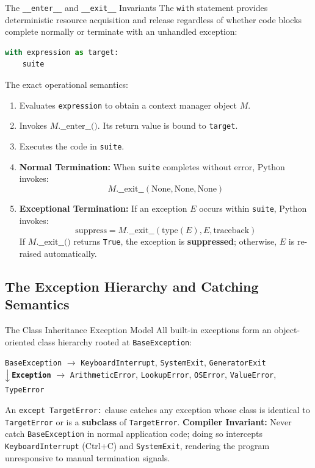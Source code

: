 \begin{theorembox}{The \texttt{\_\_enter\_\_} and \texttt{\_\_exit\_\_} Invariants}
 
The \texttt{with} statement provides deterministic resource acquisition and release regardless of whether code blocks complete normally or terminate with an unhandled exception:
\begin{lstlisting}[language=Python]
with expression as target:
    suite
\end{lstlisting}
The exact operational semantics:
\begin{enumerate}
    \item Evaluates \texttt{expression} to obtain a context manager object $M$.
    \item Invokes $M\text{.\_\_enter\_\_()}$. Its return value is bound to \texttt{target}.
    \item Executes the code in \texttt{suite}.
    \item \textbf{Normal Termination:} When \texttt{suite} completes without error, Python invokes:
    \begin{equation}
    M.\_\_\text{exit}\_\_(\text{None}, \text{None}, \text{None})
    \end{equation}
    \item \textbf{Exceptional Termination:} If an exception $E$ occurs within \texttt{suite}, Python invokes:
    \begin{equation}
    \text{suppress} = M.\_\_\text{exit}\_\_(\text{type}(E), E, \text{traceback})
    \end{equation}
    If $M\text{.\_\_exit\_\_()}$ returns \texttt{True}, the exception is \textbf{suppressed}; otherwise, $E$ is re-raised automatically.
\end{enumerate}
\end{theorembox}

\subsection{The Exception Hierarchy and Catching Semantics}

\begin{theorembox}{The Class Inheritance Exception Model}
All built-in exceptions form an object-oriented class hierarchy rooted at \texttt{BaseException}:
\begin{center}
\small
\texttt{BaseException} $\longrightarrow$ \texttt{KeyboardInterrupt}, \texttt{SystemExit}, \texttt{GeneratorExit}\\
$\rotatebox[origin=c]{270}{$\longrightarrow$}$ \textbf{\texttt{Exception}} $\longrightarrow$ \texttt{ArithmeticError}, \texttt{LookupError}, \texttt{OSError}, \texttt{ValueError}, \texttt{TypeError}
\end{center}
An \texttt{except TargetError:} clause catches any exception whose class is identical to \texttt{TargetError} or is a \textbf{subclass} of \texttt{TargetError}.
\textbf{Compiler Invariant:} Never catch \texttt{BaseException} in normal application code; doing so intercepts \texttt{KeyboardInterrupt} (Ctrl+C) and \texttt{SystemExit}, rendering the program unresponsive to manual termination signals.
\end{theorembox}

